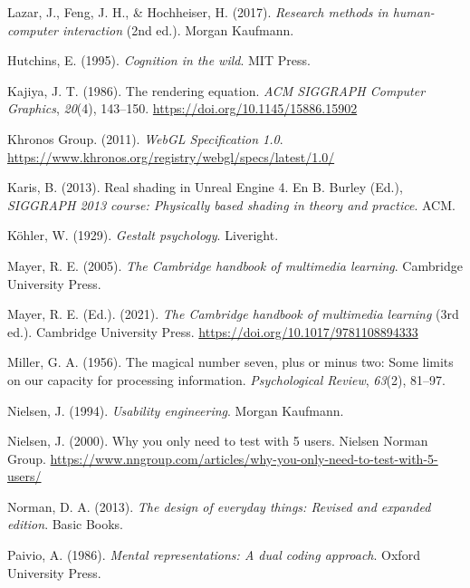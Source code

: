 \begin{list}{}
\item Lazar, J., Feng, J. H., \& Hochheiser, H. (2017). \textit{Research methods in human-computer interaction} (2nd ed.). Morgan Kaufmann.

\item Hutchins, E. (1995). \textit{Cognition in the wild}. MIT Press.

\item Kajiya, J. T. (1986). The rendering equation. \textit{ACM SIGGRAPH Computer Graphics}, \textit{20}(4), 143--150. \url{https://doi.org/10.1145/15886.15902}

\item Khronos Group. (2011). \textit{WebGL Specification 1.0}. \url{https://www.khronos.org/registry/webgl/specs/latest/1.0/}

\item Karis, B. (2013). Real shading in Unreal Engine 4. En B. Burley (Ed.), \textit{SIGGRAPH 2013 course: Physically based shading in theory and practice}. ACM.

\item K\"ohler, W. (1929). \textit{Gestalt psychology}. Liveright.

\item Mayer, R. E. (2005). \textit{The Cambridge handbook of multimedia learning}. Cambridge University Press.

\item Mayer, R. E. (Ed.). (2021). \textit{The Cambridge handbook of multimedia learning} (3rd ed.). Cambridge University Press. \url{https://doi.org/10.1017/9781108894333}

\item Miller, G. A. (1956). The magical number seven, plus or minus two: Some limits on our capacity for processing information. \textit{Psychological Review}, \textit{63}(2), 81--97.

\item Nielsen, J. (1994). \textit{Usability engineering}. Morgan Kaufmann.

\item Nielsen, J. (2000). Why you only need to test with 5 users. Nielsen Norman Group. \url{https://www.nngroup.com/articles/why-you-only-need-to-test-with-5-users/}

\item Norman, D. A. (2013). \textit{The design of everyday things: Revised and expanded edition}. Basic Books.

\item Paivio, A. (1986). \textit{Mental representations: A dual coding approach}. Oxford University Press.


\end{list}
